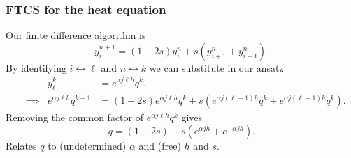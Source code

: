 \documentclass{beamer}
\begin{document}
\begin{frame}
  \frametitle{FTCS for the heat equation}
  
  Our finite difference algorithm is
  \begin{equation*}
    y_i^{n+1} = ( 1 - 2 s ) y_i^n + s \left( y_{i+1}^n + y_{i-1}^n
    \right).
  \end{equation*} \pause
  By identifying $i \leftrightarrow \ell$ and $n \leftrightarrow k$ we
  can substitute in our ansatz
  \begin{align*}
    && y_{\ell}^k & =  e^{\alpha j \ell h} q^k. \\
    & \implies & 
    e^{\alpha j \ell h} q^{k+1} &= (1 - 2 s) e^{\alpha j \ell h} q^k +
    s \left( e^{\alpha j (\ell + 1) h} q^k + e^{\alpha j (\ell - 1) h}
      q^k \right).
  \end{align*} \pause
  Removing the common factor of $e^{\alpha j \ell h} q^k$ gives
  \begin{equation*}
    q = (1 - 2 s) + s \left( e^{\alpha j h} +  e^{-\alpha j h} \right).
  \end{equation*}
  Relates $q$ to (undetermined) $\alpha$ and (free) $h$ and $s$.

\end{frame}
\end{document}
